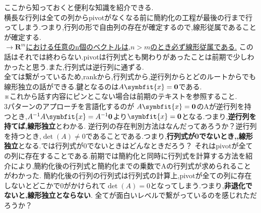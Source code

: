 ここから知っておくと便利な知識を紹介できる.\\
横長な行列は全ての列からpivotがなくなる前に簡約化の工程が最後の行まで行ってしまう.つまり,行列の形で自由列の存在が確定するので,線形従属であることが確定する.\\
$\to$\;\underline{$\mathbf{R}^m$における任意のn個のベクトルは,$n>m$のとき必ず線形従属である.}
この話はそれでは終わらない.pivotは行列式とも関わりがあったことは前期で少しわかったと思う.また,行列式は逆行列に通ずる.\\
全ては繋がっているため,rankから,行列式から,逆行列からとどのルートからでも線形独立の話ができる.鍵となるのは$A\symbfit{x}=\mathbf{0}$である.\\
※これから話す内容にピンとこない場合は前期のテキストを参照すること.\\
3パターンのアプローチを言語化するのが
$A\symbfit{x}=\mathbf{0}$のAが逆行列を持つとき,$A^{-1}A\symbfit{x}=A^{-1}\mathbf{0}$より$\symbfit{x}=\mathbf{0}$となる.つまり,\textbf{逆行列を持てば,線形独立}とわかる.
逆行列の存在判別方法はなんだってあろうか？逆行列を持つとき,$\det(A) \neq 0$であることである.つまり,\textbf{行列式が0でないとき,,線形独立}となる.では行列式が0でないときはどんなときだろう？
それはpivotが全ての列に存在することである.前期では簡約化と同時に行列式を計算する方法を紹介により,簡約化後の行列式と簡約化までの乗数でAの行列式が求められることがわかった.
簡約化後の行列の行列式は行列式の計算上,pivotが全ての列に存在しないとどこかで0がかけられて$\det(A)=0$となってしまう.つまり,\textbf{非退化でないと,線形独立とならない}.
全てが面白いレベルで繋がっているのを感じれただろうか？

